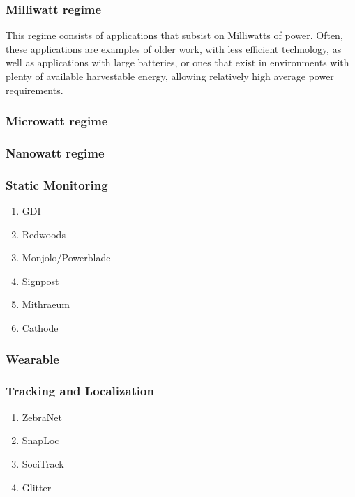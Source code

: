 \subsubsection{Milliwatt regime}
This regime consists of applications that subsist on Milliwatts of power. Often, these applications are examples of older work, with less efficient technology, as well as applications with large batteries, or ones that exist in environments with plenty of available harvestable energy, allowing relatively high average power requirements.

\subsubsection{Microwatt regime}
\subsubsection{Nanowatt regime}
\subsubsection{Static Monitoring}
\begin{enumerate}
    \item GDI ~\cite{mainwaring2002wireless}
    \item Redwoods ~\cite{tolle2005macroscope}
    \item Monjolo/Powerblade
    \item Signpost ~\cite{adkins2018signpost}
    \item Mithraeum ~\cite{afanasov2020battery}
    \item Cathode ~\cite{jagtap2021repurposing}
\end{enumerate}
\subsubsection{Wearable}
\subsubsection{Tracking and Localization}
\begin{enumerate}
    \item ZebraNet ~\cite{juang2002energy}
    \item SnapLoc ~\cite{grossiwindhager2019snaploc}
    \item SociTrack ~\cite{biri2020socitrack}
    \item Glitter ~\cite{sharma2020all}
\end{enumerate}
